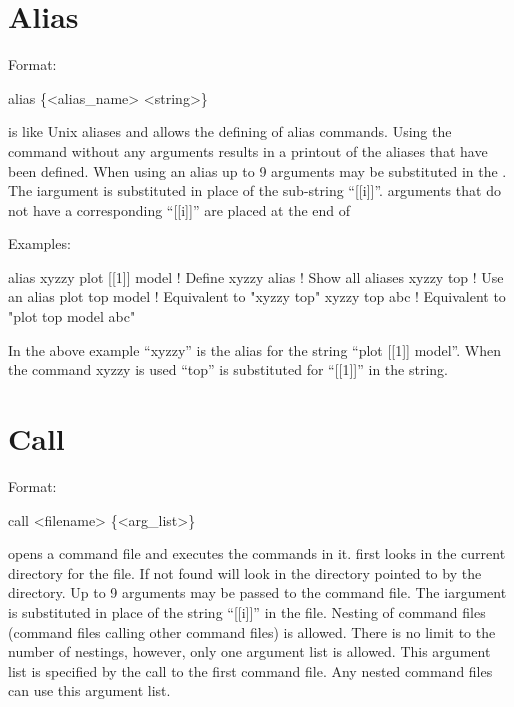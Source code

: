 \vfil
\break

\section{Alias}
\label{s:alias}

Format: 
\begin{example}
  alias \{<alias_name> <string>\}
\end{example}

\vskip 0.2in

 is like Unix aliases and allows the defining of alias
commands. Using the  command without any arguments results
in a printout of the aliases that have been defined. When using an
alias up to 9 arguments may be substituted in the . The
i\Th argument is substituted in place of the sub-string ``[[i]]''.
arguments that do not have a corresponding ``[[i]]'' are placed at the end
of 

Examples:
\begin{example}
    alias xyzzy plot [[1]] model  ! Define xyzzy
    alias                         ! Show all aliases
    xyzzy top                     ! Use an alias
    plot top model                ! Equivalent to "xyzzy top"
    xyzzy top abc                 ! Equivalent to "plot top model abc"
\end{example}
In the above example ``xyzzy'' is the alias for the string ``plot [[1]]
model''.  When the command xyzzy is used ``top'' is substituted
for ``[[1]]'' in the string.

\section{Call}
\label{s:call}

Format: 
\begin{example}
  call <filename> \{<arg_list>\}  \Strut
\end{example}

\vskip 0.2in 
 opens a command file and executes the commands
in it.  \tao first looks in the current directory for the file. If not
found \tao will look in the directory pointed to by the
 directory.  Up to 9 arguments may be passed to
the command file. The i\Th argument is substituted in place of the
string ``[[i]]'' in the file. Nesting of command files (command files
calling other command files) is allowed. There is no limit to the
number of nestings, however, only one argument list is allowed. This
argument list is specified by the call to the first command file. Any
nested command files can use this argument list.

